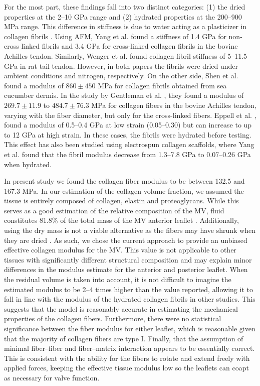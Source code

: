     For the most part, these findings fall into two distinct categories: (1) the dried properties at the 2–10 GPa range and (2) hydrated properties at the 200–900 MPa range. This difference in stiffness is due to water acting as a plasticizer in collagen fibrils \cite{tseretely_dsc_1992}. Using AFM, Yang et al. \cite{yang_micromechanical_2007} found a stiffness of 1.4 GPa for non-cross linked fibrils and 3.4 GPa for cross-linked collagen fibrils in the bovine Achilles tendon. Similarly, Wenger et al. \cite{wenger_mechanical_2007} found collagen fibril stiffness of 5–11.5 GPa in rat tail tendon. However, in both papers the fibrils were dried under ambient conditions and nitrogen, respectively. On the other side, Shen et al. \cite{shen_stress_2008} found a modulus of $860\pm450$ MPa for collagen fibrils obtained from sea cucumber dermis. In the study by Gentleman et al. \cite{gentleman_mechanical_2003}, they found a modulus of $269.7\pm11.9$ to $484.7\pm76.3$ MPa for collagen fibers in the bovine Achilles tendon, varying with the fiber diameter, but only for the cross-linked fibers. Eppell et al. \cite{eppell_nano_2006}, found a modulus of 0.5–0.4 GPa at low strain (0.05–0.30) but can increase to up to 12 GPa at high strain. In these cases, the fibrils were hydrated before testing. This effect has also been studied using electrospun collagen scaffolds, where Yang et al. found that the fibril modulus decrease from 1.3–7.8 GPa to 0.07–0.26 GPa when hydrated\cite{yang_mechanical_2008}.


    In present study we found the collagen fiber modulus to be between 132.5 and 167.3 MPa. In our estimation of the collagen volume fraction, we assumed the tissue is entirely composed of collagen, elastin and proteoglycans. While this serves as a good estimation of the relative composition of the MV, fluid constitutes 81.8\% of the total mass of the MV anterior leaflet \cite{lis_biochemical_1987}. Additionally, using the dry mass is not a viable alternative as the fibers may have shrunk when they are dried \cite{leikin_raman_1997}. As such, we chose the current approach to provide an unbiased effective collagen modulus for the MV. This value is not applicable to other tissues with significantly different structural composition and may explain minor differences in the modulus estimate for the anterior and posterior leaflet. When the residual volume is taken into account, it is not difficult to imagine the estimated modulus to be 2–4 times higher than the value reported, allowing it to fall in line with the modulus of the hydrated collagen fibrils in other studies. This suggests that the model is reasonably accurate in estimating the mechanical properties of the collagen fibers. Furthermore, there were no statistical significance between the fiber modulus for either leaflet, which is reasonable given that the majority of collagen fibers are type I. Finally, that the assumption of minimal fiber–fiber and fiber–matrix interaction appears to be essentially correct. This is consistent with the ability for the fibers to rotate and extend freely with applied forces, keeping the effective tissue modulus low so the leaflets can coapt as necessary for valve function.
    
